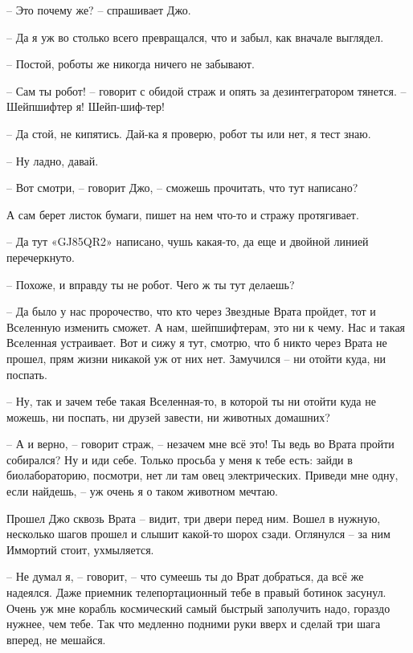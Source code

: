 \documentclass[ebook,oneside,final,openright]{memoir}
\begin{document}
– Это почему же? – спрашивает Джо.\par
– Да я уж во столько всего превращался, что и забыл, как вначале выглядел. \par
– Постой, роботы же никогда ничего не забывают. \par
– Сам ты робот! – говорит с обидой страж и опять за дезинтегратором тянется. – Шейпшифтер я! Шейп-шиф-тер! \par
– Да стой, не кипятись. Дай-ка я проверю, робот ты или нет, я тест знаю. \par
– Ну ладно, давай. \par
– Вот смотри, – говорит Джо, – сможешь прочитать, что тут написано? \par
А сам берет листок бумаги, пишет на нем что-то и стражу протягивает. \par
– Да тут «GJ85QR2» написано, чушь какая-то, да еще и двойной линией перечеркнуто.\par
– Похоже, и вправду ты не робот. Чего ж ты тут делаешь? \par
– Да было у нас пророчество, что кто через Звездные Врата пройдет, тот и Вселенную изменить сможет. А нам, шейпшифтерам, это ни к чему. Нас и такая Вселенная устраивает. Вот и сижу я тут, смотрю, что б никто через Врата не прошел, прям жизни никакой уж от них нет. Замучился – ни отойти куда, ни поспать. \par
– Ну, так и зачем тебе такая Вселенная-то, в которой ты ни отойти куда не можешь, ни поспать, ни друзей завести, ни животных домашних? \par
– А и верно, – говорит страж, – незачем мне всё это! Ты ведь во Врата пройти собирался? Ну и иди себе. Только просьба у меня к тебе есть: зайди в биолабораторию, посмотри, нет ли там овец электрических. Приведи мне одну, если найдешь, – уж очень я о таком животном мечтаю.\par
\par
\par
Прошел Джо сквозь Врата – видит, три двери перед ним. Вошел в нужную, несколько шагов прошел и слышит какой-то шорох сзади. Оглянулся – за ним Иммортий стоит, ухмыляется. \par
\par
– Не думал я, – говорит, – что сумеешь ты до Врат добраться, да всё же надеялся. Даже приемник телепортационный тебе в правый ботинок засунул. Очень уж мне корабль космический самый быстрый заполучить надо, гораздо нужнее, чем тебе. Так что медленно подними руки вверх и сделай три шага вперед, не мешайся.\par
\end{document}
